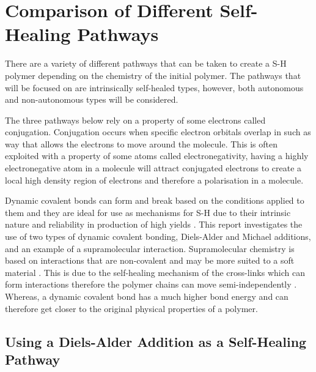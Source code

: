\section{Comparison of Different Self-Healing Pathways}
There are a variety of different pathways that can be taken to create a S-H polymer depending on the chemistry of the initial polymer. The pathways that will be focused on are intrinsically self-healed types, however, both autonomous and non-autonomous types will be considered.

The three pathways below rely on a property of some electrons called conjugation. Conjugation occurs when specific electron orbitals overlap in such as way that allows the electrons to move around the molecule. This is often exploited with a property of some atoms called electronegativity, having a highly electronegative atom in a molecule will attract conjugated electrons to create a local high density region of electrons and therefore a polarisation in a molecule. 

Dynamic covalent bonds can form and break based on the conditions applied to them \cite{guo2025diels} and they are ideal for use as mechanisms for S-H due to their intrinsic nature and reliability in production of high yields \cite{nicolaou2002diels}. This report investigates the use of two types of dynamic covalent bonding, Diels-Alder and Michael additions, and an example of a supramolecular interaction. Supramolecular chemistry is based on interactions that are non-covalent and may be more suited to a soft material \cite{yang2018self}. This is due to the self-healing mechanism of the cross-links which can form interactions therefore the polymer chains can move semi-independently \cite{wanasinghe2022dynamic,yang2018self}. Whereas, a dynamic covalent bond has a much higher bond energy \cite{guo2025diels} and can therefore get closer to the original physical properties of a polymer.

\subsection{Using a Diels-Alder Addition as a Self-Healing Pathway}

